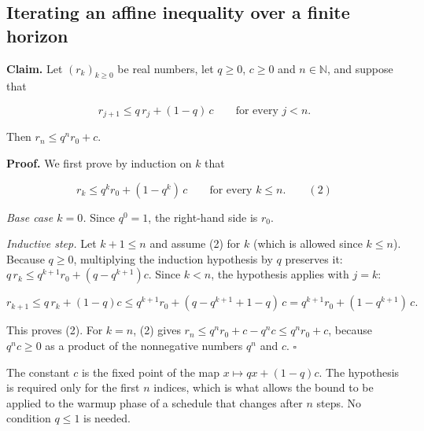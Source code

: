 \documentclass[11pt,a4paper]{report}
\begin{document}
\subsection{\texorpdfstring{Iterating an affine inequality over a finite horizon}{Iterating an affine inequality over a finite horizon}}
\label{report-step-AverageLMC-Recurrence-lean-2}


\textbf{Claim.} Let \((r_k)_{k\ge0}\) be real numbers, let \(q\ge0\), \(c\ge0\) and \(n\in\mathbb N\), and suppose that


\[r_{j+1}\le q\,r_j+(1-q)\,c\qquad\text{for every }j<n.\]


Then \(r_n\le q^nr_0+c\).




\textbf{Proof.} We first prove by induction on \(k\) that


\[r_k\le q^kr_0+(1-q^k)\,c\qquad\text{for every }k\le n.\qquad(2)\]


\emph{Base case \(k=0\).} Since \(q^0=1\), the right-hand side is \(r_0\).




\emph{Inductive step.} Let \(k+1\le n\) and assume (2) for \(k\) (which is allowed since \(k\le n\)). Because \(q\ge0\), multiplying the induction hypothesis by \(q\) preserves it: \(q\,r_k\le q^{k+1}r_0+(q-q^{k+1})c\). Since \(k<n\), the hypothesis applies with \(j=k\):


\[r_{k+1}\le q\,r_k+(1-q)c\le q^{k+1}r_0+(q-q^{k+1}+1-q)\,c=q^{k+1}r_0+(1-q^{k+1})\,c.\]


This proves (2). For \(k=n\), (2) gives \(r_n\le q^nr_0+c-q^nc\le q^nr_0+c\), because \(q^nc\ge0\) as a product of the nonnegative numbers \(q^n\) and \(c\). \(\square\)




The constant \(c\) is the fixed point of the map \(x\mapsto qx+(1-q)c\). The hypothesis is required only for the first \(n\) indices, which is what allows the bound to be applied to the warmup phase of a schedule that changes after \(n\) steps. No condition \(q\le1\) is needed.
\end{document}
